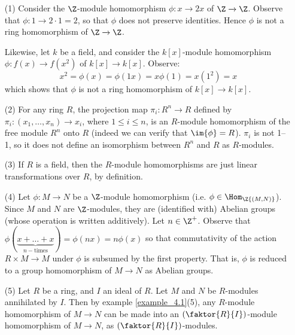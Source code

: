 \begin{example}\label{example_4.3}
  \begin{enumerate}
    \item[(1)] Consider the $\Z$-module homomorphism  $\phi:x
      \xrightarrow{} 2x$ of $\Z \xrightarrow{} \Z$. Observe that
      $\phi:1 \xrightarrow{} 2 \cdot 1=2$, so that $\phi$ does not
      preserve identities. Hence  $\phi$ is not a ring homomorphism of
       $\Z \xrightarrow{} \Z$.

       Likewise, let $k$ be a field, and consider the $k[x]$-module
       homomorphism $\phi:f(x) \xrightarrow{} f(x^2)$ of $k[x]
       \xrightarrow{} k[x]$. Observe:
       \begin{equation*}
         x^2=\phi(x)=\phi(1x)=x\phi(1)=x(1^2)=x
       \end{equation*}
       which shows that $\phi$ is not a ring homomorphism of  $k[x]
       \xrightarrow{} k[x]$.

     \item[(2)] For any ring $R$, the projection map $\pi_i:R^n
       \xrightarrow{} R$ defined by $\pi_i:(x_1, \dots, x_n)
       \xrightarrow{} x_i$, where $1 \leq i \leq n$, is an $R$-module
       homomorphism of the free module $R^n$ onto $R$ (indeed we can
       verify that $\im{\phi}=R$). $\pi_i$ is not 1--1, so it does not
       define an isomorphism between $R^n$ and $R$ as  $R$-modules.

     \item[(3)] If $R$ is a field, then the  $R$-module homomorphisms
       are just linear transformations over  $R$, by definition.

     \item[(4)] Let $\phi:M \xrightarrow{} N$ be a $\Z$-module
       homomorphism (i.e. $\phi \in \Hom_\Z{(M,N)}$). Since $M$ and
       $N$ are $\Z$-modules, they are (identified with) Abelian
       groups (whose operation is written additively). Let $n \in \Z^+$.
       Observe that
       $\phi(\underbrace{x+\dots+x}_{n-\text{times}})=\phi(nx)=n\phi(x)$
       so that commutativity of the action $R \times M \xrightarrow{}
       M$ under $\phi$ is subsumed by the first property. That is,
       $\phi$ is reduced to a group homomorphism of $M \xrightarrow{}
       N$ as Abelian groups.

     \item[(5)] Let $R$ be a ring, and $I$ an ideal of $R$. Let  $M$
       and  $N$ be  $R$-modules annihilated by  $I$. Then by example
       \ref{example_4.1}(5), any $R$-module homomorphism of $M
       \xrightarrow{} N$ can be made into an $(\faktor{R}{I})$-module
       homomorphism of $M \xrightarrow{} N$, as
       $(\faktor{R}{I})$-modules.


\end{enumerate}
\end{example}

